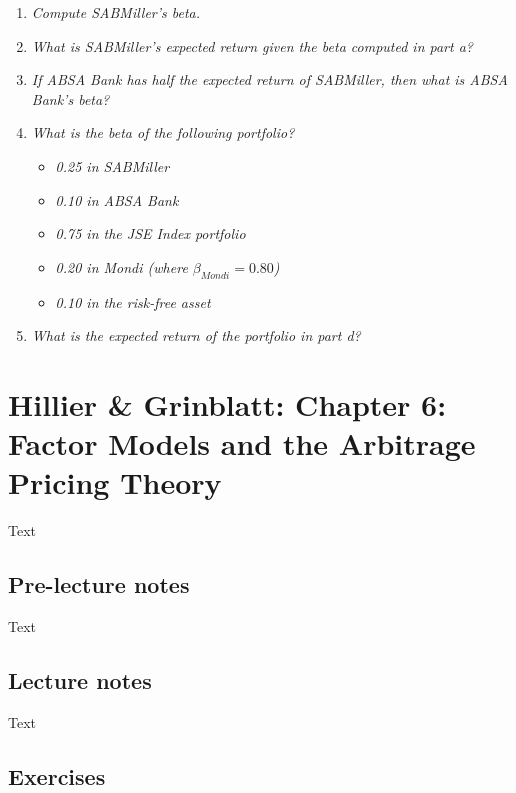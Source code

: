 \documentclass[]{book}
\theoremstyle{definition}
\theoremstyle{definition}
\theoremstyle{remark}
\begin{document}
\begin{enumerate}
\def\labelenumi{\alph{enumi}.}
\item
  \emph{Compute SABMiller's beta.} \citep[p.162]{book}
\item
  \emph{What is SABMiller's expected return given the beta computed in
  part a?} \citep[p.162]{book}
\item
  \emph{If ABSA Bank has half the expected return of SABMiller, then
  what is ABSA Bank's beta?} \citep[p.162]{book}
\item
  \emph{What is the beta of the following portfolio?}
  \citep[p.162]{book}

  \begin{itemize}
  \item
    \emph{0.25 in SABMiller} \citep[p.162]{book}
  \item
    \emph{0.10 in ABSA Bank} \citep[p.162]{book}
  \item
    \emph{0.75 in the JSE Index portfolio} \citep[p.162]{book}
  \item
    \emph{0.20 in Mondi (where \(\beta_{Mondi} = 0.80\))}
    \citep[p.162]{book}
  \item
    \emph{0.10 in the risk-free asset} \citep[p.162]{book}
  \end{itemize}
\item
  \emph{What is the expected return of the portfolio in part d?}
  \citep[p.162]{book}
\end{enumerate}

\chapter{Hillier \& Grinblatt: Chapter 6: Factor Models and the
Arbitrage Pricing
Theory}\label{hillier-grinblatt-chapter-6-factor-models-and-the-arbitrage-pricing-theory}

Text

\section{Pre-lecture notes}\label{pre-lecture-notes-5}

Text

\section{Lecture notes}\label{lecture-notes-5}

Text

\section{Exercises}\label{exercises-5}
\end{document}
